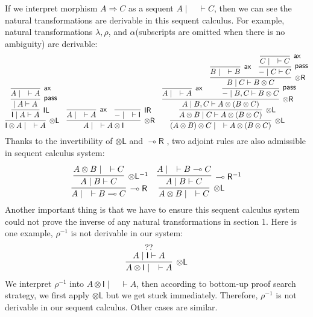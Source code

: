 \documentclass[submission,copyright,creativecommons]{eptcs}
\newcommand{\tl}{\otimes \mathsf{L}}
\newcommand{\tr}{\otimes \mathsf{R}}
\newcommand{\lright}{\multimap \mathsf{R}}
\newcommand{\pass}{\mathsf{pass}}
\newcommand{\unitl}{\mathsf{IL}}
\newcommand{\unitr}{\mathsf{IR}}
\newcommand{\ax}{\mathsf{ax}}
\newcommand{\ot}{\otimes}
\newcommand{\lolli}{\multimap}
\newcommand{\I}{\mathsf{I}}
\begin{document}
If we interpret morphism $A \Longrightarrow C$ as a sequent $A \mid \quad \vdash C$, then we can see the natural transformations are derivable in this sequent calculus.
For example, natural transformations $\lambda , \rho$, and $\alpha$(subscripts are omitted when there is no ambiguity) are derivable:
\begin{displaymath}
  \infer[\tl]{\I \ot A \mid \quad \vdash A}{
    \infer[\unitl]{\I \mid A \vdash A}{
      \infer[\pass]{ \mid A \vdash A}{
        \infer[\ax]{A \mid \quad \vdash A}{}
      }
    }
  }
  \quad
  \infer[\tr]{A \mid \quad \vdash A \ot \I}{
    \infer[\ax]{A \mid \quad \vdash A}{}
    &
    \infer[\unitr]{- \mid \quad \vdash \I}{}
  }
  \quad
  \infer[\tl]{(A \ot B) \ot C \mid \quad \vdash A \ot (B \ot C)}{
    \infer[\tl]{A \ot B \mid C \vdash A \ot (B \ot C)}{
      \infer[\tr]{A \mid B , C \vdash A \ot (B \ot C)}{
        \infer[\ax]{A \mid \quad \vdash A}{}
        &
        \infer[\pass]{- \mid B , C \vdash B \ot C}{
          \infer[\tr]{B \mid C \vdash B \ot C}{
            \infer[\ax]{B \mid \quad \vdash B}{}
            &
            \infer[\pass]{- \mid C \vdash C}{
              \infer[\ax]{C \mid \quad \vdash C}{}
            }
          }
        }
      }
    }
  }
\end{displaymath}
Thanks to the invertibility of $\tl$ and $\lright$ \cite{uustalu:sequent:2018} \cite{uustalu:deductive:nodate}, two adjoint rules are also admissible in sequent calculus system:
\begin{displaymath}
  \infer[\lright]{A \mid \quad \vdash B \multimap C}{
    \infer[\tl^{-1}]{A \mid B \vdash C}{
      \deduce{A \ot B \mid \quad \vdash C}{}
   }
  }
  \quad
  \infer[\tl]{A \ot B \mid \quad \vdash C}{
    \infer[\lright^{-1}]{A \mid B \vdash C}{
      \deduce{A \mid \quad \vdash B \lolli C}{}
    }
  }
\end{displaymath}
Another important thing is that we have to ensure this sequent calculus system could not prove the inverse of any natural transformations in section 1.
Here is one example, $\rho^{-1}$ is not derivable in our system:
\begin{displaymath}
  \infer[\tl]{A \ot \I \mid \quad \vdash A}{
    \deduce{A \mid \I \vdash A}{??}
  }
\end{displaymath}
We interpret $\rho^{-1}$ into $A \ot \I \mid \quad \vdash A$, then according to bottom-up proof search strategy, we first apply $\tl$ but we get stuck immediately.
Therefore, $\rho^{-1}$ is not derivable in our sequent calculus.
Other cases are similar.
\end{document}
